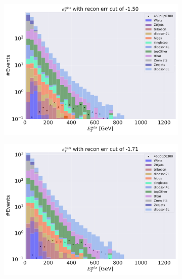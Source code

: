 \begin{figure}[H]
    \centering
    \begin{subfigure}{.45\textwidth}
        \includegraphics[width=\textwidth]{Figures/AE_testing/big/3lep/b_data_recon_big_rm3_feats_sig_450p0p0300_etmiss_recon_errcut_-1.50.pdf}
        \caption{ }
        \label{fig:AE_3lep_big_450_cut_etmiss}
    \end{subfigure}
    \hfill
    \begin{subfigure}{.45\textwidth}
        \includegraphics[width=\textwidth]{Figures/AE_testing/small/3lep/b_data_recon_big_rm3_feats_sig_450p0p0300_etmiss_recon_errcut_-1.71.pdf}
        \caption{}
        \label{fig:AE_3lep_small_450_cut_etmiss}
    \end{subfigure}

\end{figure}
